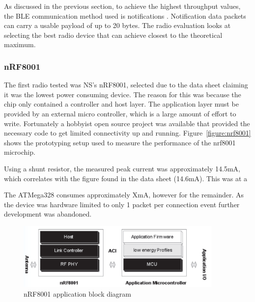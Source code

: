 \documentclass[]{article}
\begin{document}
{As discussed in the previous section, to achieve the highest throughput values, the \ac{BLE} communication method used is notifications . Notification data packets can carry a usable payload of up to 20 bytes. The radio evaluation looks at selecting the best radio device that can achieve closest to the theoretical maximum.


\subsubsection{nRF8001}
The first radio tested was \ac{NS}'s nRF8001, selected due to the data sheet claiming it was the lowest power consuming device. The reason for this was because the chip only contained a controller and host layer. The application layer must be provided by an external micro controller, which is a large amount of effort to write. Fortunately a hobbyist open source project\cite{Guan2013} was available that provided the necessary code to get limited connectivity up and running. Figure~\ref{figure:nrf8001} shows the prototyping setup used to measure the performance of the nrf8001 microchip. 

Using a shunt resistor, the measured peak current was approximately 14.5mA, which correlates with the figure found in the data sheet (14.6mA). This was at a 

The ATMega328 consumes approximately XmA, however for the remainder. As the device was hardware limited to only 1 packet per connection event further development was abandoned.

\begin{figure}[h]
	\begin{center}
		\includegraphics[width = 0.9\textwidth]{nrf8001stack}
	\end{center}
	\caption{nRF8001 application block diagram }
	\label{fig:nrf8001stack}
\end{figure}


}
\end{document}
